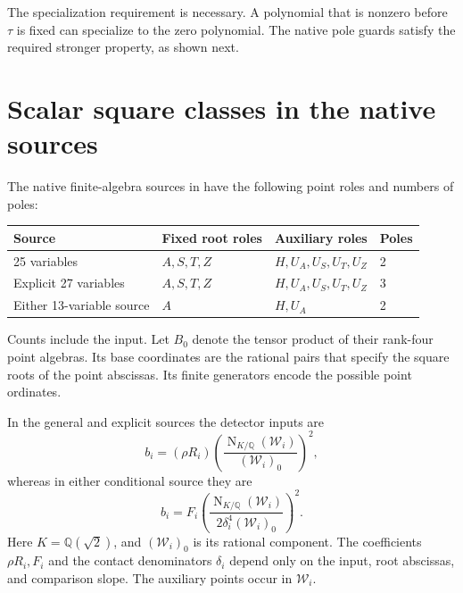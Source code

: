 \documentclass[11pt,a4paper]{article}
\theoremstyle{remark}\newtheorem{remark}[theorem]{Remark}
\newcommand{\Q}{\mathbb Q}\newcommand{\Z}{\mathbb Z}
\DeclareMathOperator{\N}{N}
\begin{document}
The specialization requirement is necessary. A polynomial that is
nonzero before $\tau$ is fixed can specialize to the zero polynomial.
The native pole guards satisfy the required stronger property, as shown
next.

\section{Scalar square classes in the native sources}

The native finite-algebra sources in \cite{UnitNorm} have the following
point roles and numbers of poles:
\begin{center}
\begin{tabular}{llll}\toprule
Source & Fixed root roles & Auxiliary roles & Poles\\\midrule
25 variables & $A,S,T,Z$ & $H,U_A,U_S,U_T,U_Z$ & 2\\
Explicit 27 variables & $A,S,T,Z$ & $H,U_A,U_S,U_T,U_Z$ & 3\\
Either 13-variable source & $A$ & $H,U_A$ & 2\\\bottomrule
\end{tabular}
\end{center}
Counts include the input. Let $B_0$ denote the tensor product of their
rank-four point algebras. Its base coordinates are the rational pairs
that specify the square roots of the point abscissas. Its finite
generators encode the possible point ordinates.

In the general and explicit sources the detector inputs are
\begin{equation}\label{eq:generalinput}
 b_i=(\rho R_i)
       \left(\frac{\N_{K/\Q}(\mathcal W_i)}{(\mathcal W_i)_0}\right)^2,
\end{equation}
whereas in either conditional source they are
\begin{equation}\label{eq:conditionalinput}
 b_i=F_i
       \left(\frac{\N_{K/\Q}(\mathcal W_i)}
                    {2\delta_i^4(\mathcal W_i)_0}\right)^2.
\end{equation}
Here $K=\Q(\sqrt2)$, and $(\mathcal W_i)_0$ is its rational
component. The coefficients $\rho R_i,F_i$ and the contact denominators
$\delta_i$ depend only on the input, root abscissas, and comparison
slope. The auxiliary points occur in $\mathcal W_i$.
\end{document}
